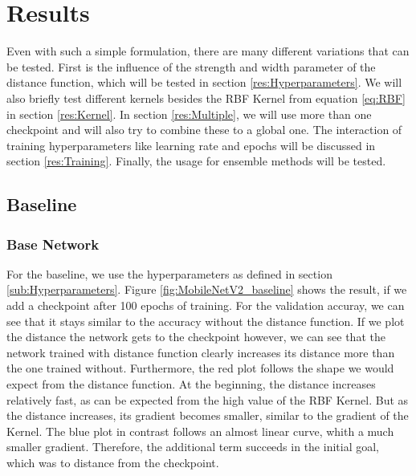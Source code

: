 \chapter{Results}
Even with such a simple formulation, there are many different variations that
can be tested. First is the influence of the strength and width parameter of the
distance function, which will be tested in section \ref{res:Hyperparameters}. We
will also briefly test different kernels besides the RBF Kernel from equation
\ref{eq:RBF} in section \ref{res:Kernel}. In section \ref{res:Multiple}, we will
use more than one checkpoint and will also try to combine these to a global one.
The interaction of training hyperparameters like learning rate and epochs will
be discussed in section \ref{res:Training}. Finally, the usage for ensemble
methods will be tested.

\section{Baseline}
\subsection{Base Network} %
For the baseline, we use the hyperparameters as defined in section
\ref{sub:Hyperparameters}. Figure \ref{fig:MobileNetV2_baseline} shows the
result, if we add a checkpoint after 100 epochs of training. For the validation
accuray, we can see that it stays similar to the accuracy without the distance
function. If we plot the distance the network gets to the checkpoint however, we
can see that the network trained with distance function clearly increases its
distance more than the one trained without. Furthermore, the red plot follows
the shape we would expect from the distance function. At the beginning, the
distance increases relatively fast, as can be expected from the high value of
the RBF Kernel. But as the distance increases, its gradient becomes smaller,
similar to the gradient of the Kernel. The blue plot in contrast follows an
almost linear curve, whith a much smaller gradient. Therefore, the additional
term succeeds in the initial goal, which was to distance from the checkpoint.

